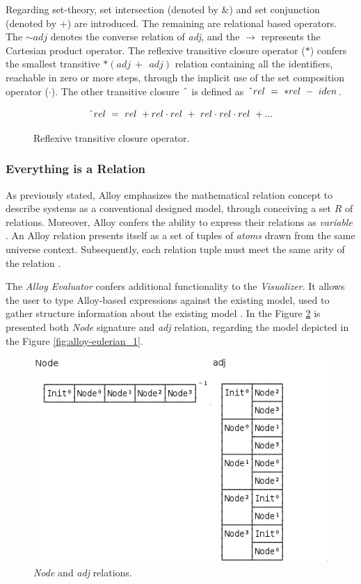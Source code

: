 Regarding set-theory, set intersection (denoted by $\&$) and set conjunction (denoted by $+$) are introduced. The remaining are relational based operators. The $\sim adj$ denotes the converse relation of \textit{adj}, and the $\rightarrow$ represents the Cartesian product operator. The reflexive transitive closure operator ($\ast$) confers the
smallest transitive $\ast(adj\ +\ ~adj)$ relation containing all the identifiers, reachable in zero or more steps, through the implicit use of the set composition operator ($\cdot$). The other transitive closure $\string^$ is defined as $\string^ rel\ =\ \ast rel\ -\ iden$.

\begin{figure}[H]
    \[\string^ rel\ =\ rel\ + rel \cdot rel\ +\ rel \cdot rel \cdot rel\ + ... \]  
\caption{Reflexive transitive closure operator.}
\label{math:alloy-transitive}
\end{figure}

\subsubsection{Everything is a Relation}

As previously stated, Alloy emphasizes the mathematical relation concept to describe systems as a conventional designed model, through conceiving a set $R$ of relations. Moreover, Alloy confers the ability to express their relations as \textit{variable} \cite{lwspecification}. An Alloy relation presents itself as a set of tuples of \textit{atoms} drawn from the same universe context. Subsequently, each relation tuple must meet the same arity of the relation \cite{alloy-docs}.

The \textit{Alloy Evaluator} \cite{alloy-6} confers additional functionality to the \textit{Visualizer}. It allows the user to type Alloy-based expressions against the existing model, used to gather structure information about the existing model \cite{alloy-docs}. In the Figure \ref{fig:alloy-evaluator_1} is presented both \textit{Node} signature and \textit{adj} relation, regarding the model depicted in the Figure \ref{fig:alloy-eulerian_1}.

\begin{figure}[H]
    \centering
    \includegraphics[width=0.5\linewidth]{images/alloy_evaluator1.png}
    \caption{\textit{Node} and \textit{adj} relations.}
    \label{fig:alloy-evaluator_1}
\end{figure}

